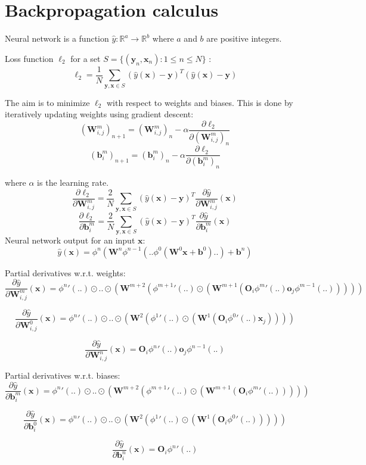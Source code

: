 \documentclass{article}
\begin{document}
\section{Backpropagation calculus}

Neural network is a function $\hat{y}: \mathbb{R}^a \rightarrow \mathbb{R}^b$ where $a$ and $b$ are positive integers.

\noindent 
Loss function $\ell_2$ for a set $S = \{(\textbf{y}_n, \textbf{x}_n) : 1 \le n \le N\}$ :
$$\ell_2 = \frac{1}{N}\sum_{\textbf{y},\textbf{x}\in S}(\hat{y}(\textbf{x})-\textbf{y})^T(\hat{y}(\textbf{x})-\textbf{y})$$

\noindent 
The aim is to minimize $\ell_2$ with respect to weights and biases. This is done by iteratively updating weights using gradient descent:
$$(\textbf{W}^m_{i,j})_{n+1} = (\textbf{W}^m_{i,j})_{n} - \alpha\frac{\partial \ell_2}{\partial(\textbf{W}^m_{i,j})_{n}}$$
$$(\textbf{b}^m_{i})_{n+1} = (\textbf{b}^m_{i})_{n} - \alpha\frac{\partial \ell_2}{\partial(\textbf{b}^m_{i})_{n}}$$

\noindent
where $\alpha$ is the learning rate.
$$\frac{\partial \ell_2}{\partial\textbf{W}^m_{i,j}} = \frac{2}{N}\sum_{\textbf{y},\textbf{x}\in S}(\hat{y}(\textbf{x})-\textbf{y})^T\frac{\partial \hat{y}}{\partial \textbf{W}^m_{i,j}}(\textbf{x})$$
$$\frac{\partial \ell_2}{\partial\textbf{b}^m_{i}} = \frac{2}{N}\sum_{\textbf{y},\textbf{x}\in S}(\hat{y}(\textbf{x})-\textbf{y})^T\frac{\partial \hat{y}}{\partial \textbf{b}^m_{i}}(\textbf{x})$$
\noindent 
Neural network output for an input $\textbf{x}$:
$$\hat{y}(\textbf{x})=\phi^n(\textbf{W}^n\phi^{n-1}(..\phi^{0}(\textbf{W}^0\textbf{x}+\textbf{b}^0)..)+\textbf{b}^n)$$

\noindent 
Partial derivatives w.r.t. weights:
$$\frac{\partial \hat{y}}{\partial \textbf{W}^m_{i,j}}(\textbf{x})={\phi^n}'(..)\odot..\odot(\textbf{W}^{m+2}({\phi^{m+1}}'(..)\odot(\textbf{W}^{m+1}(\textbf{O}_i{\phi^{m}}'(..)\textbf{o}_j\phi^{m-1}(..)))))$$

$$\frac{\partial \hat{y}}{\partial \textbf{W}^0_{i,j}}(\textbf{x})={\phi^n}'(..)\odot..\odot(\textbf{W}^{2}({\phi^{1}}'(..)\odot(\textbf{W}^{1}(\textbf{O}_i{\phi^{0}}'(..)\textbf{x}_j))))$$

$$\frac{\partial \hat{y}}{\partial \textbf{W}^n_{i,j}}(\textbf{x})=\textbf{O}_i{\phi^{n}}'(..)\textbf{o}_j\phi^{n-1}(..)$$

\noindent 
Partial derivatives w.r.t. biases:
$$\frac{\partial \hat{y}}{\partial \textbf{b}^m_{i}}(\textbf{x})={\phi^n}'(..)\odot..\odot(\textbf{W}^{m+2}({\phi^{m+1}}'(..)\odot(\textbf{W}^{m+1}(\textbf{O}_i{\phi^{m}}'(..)))))$$

$$\frac{\partial \hat{y}}{\partial \textbf{b}^0_{i}}(\textbf{x})={\phi^n}'(..)\odot..\odot(\textbf{W}^{2}({\phi^{1}}'(..)\odot(\textbf{W}^{1}(\textbf{O}_i{\phi^{0}}'(..)))))$$

$$\frac{\partial \hat{y}}{\partial \textbf{b}^n_{i}}(\textbf{x})=\textbf{O}_i{\phi^{n}}'(..)$$
\end{document}
